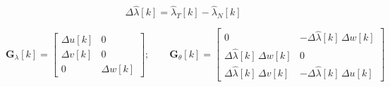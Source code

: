 \documentclass[UTF8,11pt,a4paper]{ctexart}
\newcommand{\lamhat}[1]{\hat{\lambda}_{#1}[k]}   %
\begin{document}
\[
\Delta\hat{\lambda}[k] = \lamhat{T} - \lamhat{N}
\]

\[
\mathbf{G}_\lambda[k]
= \begin{bmatrix}
\Delta u[k] & 0\\
\Delta v[k] & 0\\
0 & \Delta w[k]
\end{bmatrix};\qquad
\mathbf{G}_\theta[k]
= \begin{bmatrix}
0 & -\Delta\hat{\lambda}[k]\,\Delta w[k]\\
\Delta\hat{\lambda}[k]\,\Delta w[k] & 0\\
\Delta\hat{\lambda}[k]\,\Delta v[k] & -\Delta\hat{\lambda}[k]\,\Delta u[k]
\end{bmatrix}
\]
\end{document}
